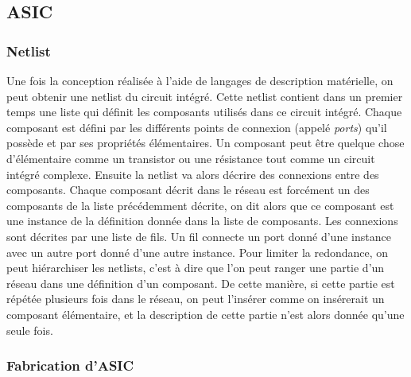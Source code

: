 \subsection{ASIC}

\subsubsection{Netlist} Une fois la conception réalisée à l'aide de langages de
description matérielle, on peut obtenir une netlist du circuit intégré. Cette
netlist contient dans un premier temps une liste qui définit les composants utilisés
dans ce circuit intégré. Chaque composant est défini par les différents points de
connexion (appelé \textit{ports}) qu'il possède et par ses propriétés élémentaires. Un
composant peut être quelque chose d'élémentaire comme un transistor ou une résistance
tout comme un circuit intégré complexe. Ensuite la netlist va alors décrire des
connexions entre des composants. Chaque composant décrit dans le réseau est forcément
un des composants de la liste précédemment décrite, on dit alors que ce composant est
une instance de la définition donnée dans la liste de composants. Les connexions sont
décrites par une liste de fils. Un fil connecte un port donné d'une instance avec un
autre port donné d'une autre instance. Pour limiter la redondance, on peut
hiérarchiser les netlists, c'est à dire que l'on peut ranger une partie d'un réseau
dans une définition d'un composant. De cette manière, si cette partie est répétée
plusieurs fois dans le réseau, on peut l'insérer comme on insérerait un composant
élémentaire, et la description de cette partie n'est alors donnée qu'une seule fois.

\subsubsection{Fabrication d'ASIC}

